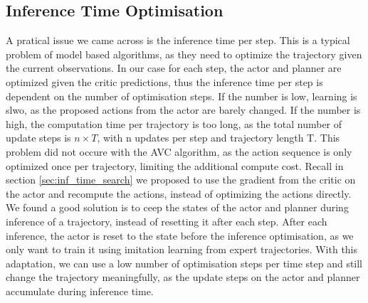 \subsection{Inference Time Optimisation}
A pratical issue we came across is the inference time per step. This is a typical problem of model based algorithms, as they need to optimize the trajectory given 
the current observations. In our case for each step, the actor and planner are optimized given the critic predictions, thus the inference time 
per step is dependent on the number of optimisation steps. If the number is low, learning is slwo, as the proposed actions from the actor are barely changed. 
If the number is high, the computation time per trajectory is too long, as the total number of update steps is $n \times T$, with n updates per step and trajectory length 
T. This problem did not occure with the AVC algorithm, as the action sequence is only optimized 
once per trajectory, limiting the additional compute cost. Recall in section \ref{sec:inf_time_search} we proposed to use the gradient from the critic on the actor and recompute the 
actions, instead of optimizing the actions directly. We found a good solution is to ceep the states of the actor and planner during inference of a trajectory, 
instead of resetting it after each step. After each inference, the actor is reset to the state before the inference optimisation, as we only want to 
train it using imitation learning from expert trajectories. With this adaptation, we can use a low number of optimisation steps per time step and still change the trajectory meaningfully, 
as the update steps on the actor and planner accumulate during inference time.
     

